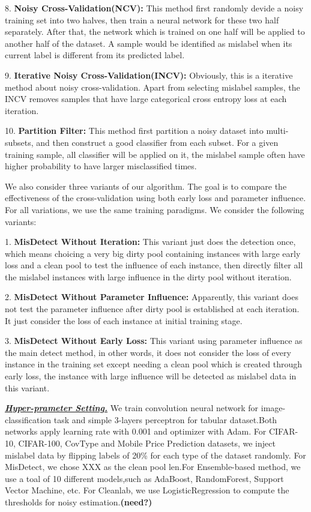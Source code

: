 8. \textbf{Noisy Cross-Validation(NCV):} This method first randomly devide a noisy training set into two halves, then train a neural network for these two half separately. After that, the network which is trained on one half will be applied to another half of the dataset. A sample would be identified as mislabel when its current label is different from its predicted label.

9. \textbf{Iterative Noisy Cross-Validation(INCV):} Obviously, this is a iterative method about noisy cross-validation. Apart from selecting mislabel samples, the INCV removes samples that have large categorical cross entropy loss at each iteration.

10. \textbf{Partition Filter:} This method first partition a noisy dataset into multi-subsets, and then construct a good classifier from each subset. For a given training sample, all classifier will be applied on it, the mislabel sample often have higher probability to have larger misclassified times.

We also consider three variants of our algorithm. The goal is to compare the effectiveness of the cross-validation using both early loss and parameter influence. For all variations, we use the same training paradigms. We consider the following variants:

1. \textbf{MisDetect Without Iteration: } This variant just does the detection once, which means choicing a very big dirty pool containing instances with large early loss and a clean pool to test the influence of each instance, then directly filter all the mislabel instances with large influence in the dirty pool without iteration.

2. \textbf{MisDetect Without Parameter Influence:} Apparently, this variant does not test the parameter influence after dirty pool is established at each iteration. It just consider the loss of each instance at initial training stage.

3. \textbf{MisDetect Without Early Loss:} This variant using parameter influence as the main detect method, in other words, it does not consider the loss of every instance in the training set except needing a clean pool which is created through early loss, the instance with large influence will be detected as mislabel data in this variant.

\textbf{\textit{\underline{Hyper-prameter Setting.}}} We train convolution neural network for image-classification task and simple 3-layers perceptron for tabular dataset.Both networks apply learning rate with 0.001 and optimizer with Adam. For CIFAR-10, CIFAR-100, CovType and Mobile Price Prediction datasets, we inject mislabel data by flipping labels of 20\% for each type of the dataset randomly. For MisDetect, we chose XXX as the clean pool len.For Ensemble-based method, we use a toal of 10 different models,such as AdaBoost, RandomForest, Support Vector Machine, etc. For Cleanlab, we use LogisticRegression to compute the thresholds for noisy estimation.\textbf{(need?)}

